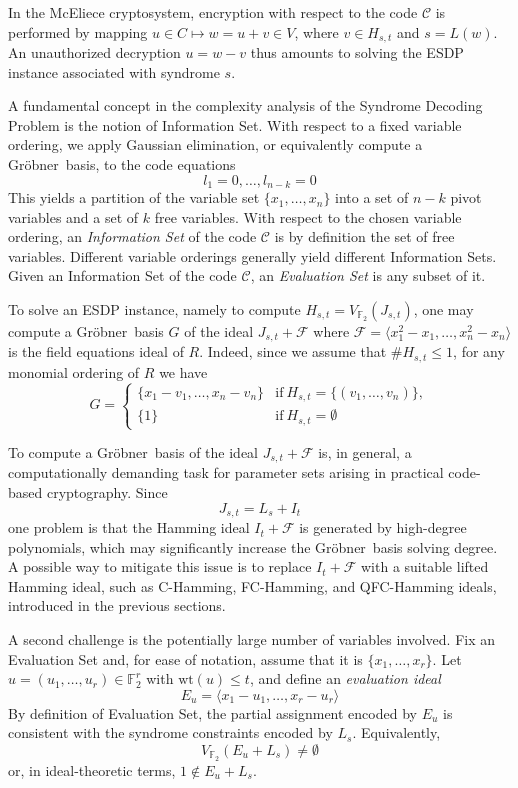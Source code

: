 \documentclass{amsart}
\def\FF{{\mathbb F}}
\def\Gr{Gr\"obner}
\def\wt{{\mathrm{wt}}}
\def\cF{{\mathcal{F}}}
\def\cC{{\mathcal{C}}}
\begin{document}
In the McEliece cryptosystem, encryption with respect to the code $\cC$ is performed by
mapping $u\in C \mapsto w = u + v\in V$, where $v\in H_{s,t}$ and $s = L(w)$.
An unauthorized decryption $u = w - v$ thus amounts to solving the ESDP instance
associated with syndrome $s$.

A fundamental concept in the complexity analysis of the Syndrome Decoding Problem
is the notion of Information Set. With respect to a fixed variable ordering, we
apply Gaussian elimination, or equivalently compute a \Gr\ basis, to the code equations
\[
l_1 = 0, \ldots, l_{n-k} = 0
\]
This yields a partition of the variable set $\{x_1,\ldots,x_n\}$ into a set of
$n-k$ pivot variables and a set of $k$ free variables. With respect to the chosen
variable ordering, an {\em Information Set} of the code $\cC$ is by definition the set
of free variables. Different variable orderings generally yield different Information
Sets. Given an Information Set of the code $\cC$, an {\em Evaluation Set} is any subset
of it.

To solve an ESDP instance, namely to compute $H_{s,t} = V_{\FF_2}(J_{s,t})$, one may
compute a \Gr\ basis $G$ of the ideal $J_{s,t} + \cF$
where $\cF = \langle x_1^2 - x_1, \ldots, x_n^2 - x_n \rangle$ is the field equations
ideal of $R$. Indeed, since we assume that $\# H_{s,t}\leq 1$, for any monomial
ordering of $R$ we have
\[
G = 
\left\{
\begin{array}{cl}
\{x_1 - v_1,\ldots,x_n - v_n\} & \mbox{if}\ H_{s,t} = \{(v_1,\ldots,v_n)\}, \\
\{1\} & \mbox{if}\ H_{s,t} = \emptyset
\end{array}
\right.
\]

To compute a \Gr\ basis of the ideal $J_{s,t} + \cF$ is, in general, a computationally demanding
task for parameter sets arising in practical code-based cryptography. Since
\[
J_{s,t} = L_s + I_t
\]
one problem is that the Hamming ideal $I_t + \cF$ is generated by high-degree polynomials, which may
significantly increase the \Gr\ basis solving degree. A possible way to mitigate this issue
is to replace $I_t + \cF$ with a suitable lifted Hamming ideal, such as C-Hamming, FC-Hamming,
and QFC-Hamming ideals, introduced in the previous sections.

A second challenge is the potentially large number of variables involved.
Fix an Evaluation Set and, for ease of notation, assume that it is $\{x_1,\ldots,x_r\}$.
Let $u = (u_1,\ldots,u_r)\in\FF_2^r$ with $\wt(u)\leq t$, and define an
{\em evaluation ideal}
\[
E_u = \langle x_1 - u_1,\ldots,x_r - u_r \rangle
\]
By definition of Evaluation Set, the partial assignment encoded by $E_u$ is consistent
with the syndrome constraints encoded by $L_s$. Equivalently,
\[
V_{\FF_2}(E_u + L_s) \neq \emptyset
\]
or, in ideal-theoretic terms, $1\notin E_u + L_s$.
\end{document}
